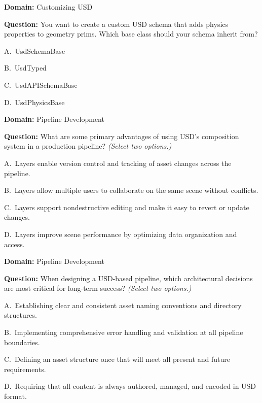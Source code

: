 \noindent\textbf{Domain:} Customizing USD\par
\vspace{0.4em}
\noindent\textbf{Question:} You want to create a custom USD schema that adds physics properties to geometry prims. Which base class should your schema inherit from?
\begin{Choices}
  \item A.\ UsdSchemaBase
  \item B.\ UsdTyped
  \item C.\ UsdAPISchemaBase
  \item D.\ UsdPhysicsBase
\end{Choices}

\noindent\textbf{Domain:} Pipeline Development\par
\vspace{0.4em}
\noindent\textbf{Question:} What are some primary advantages of using USD’s composition system in a production pipeline? \textit{(Select two options.)}
\begin{Choices}
  \item A.\ Layers enable version control and tracking of asset changes across the pipeline.
  \item B.\ Layers allow multiple users to collaborate on the same scene without conflicts.
  \item C.\ Layers support nondestructive editing and make it easy to revert or update changes.
  \item D.\ Layers improve scene performance by optimizing data organization and access.
\end{Choices}

\noindent\textbf{Domain:} Pipeline Development\par
\vspace{0.4em}
\noindent\textbf{Question:} When designing a USD-based pipeline, which architectural decisions are most critical for long-term success? \textit{(Select two options.)}
\begin{Choices}
  \item A.\ Establishing clear and consistent asset naming conventions and directory structures.
  \item B.\ Implementing comprehensive error handling and validation at all pipeline boundaries.
  \item C.\ Defining an asset structure once that will meet all present and future requirements.
  \item D.\ Requiring that all content is always authored, managed, and encoded in USD format.
\end{Choices}

